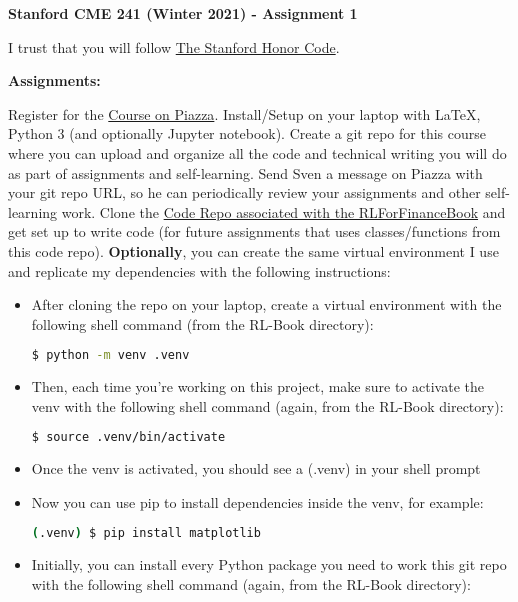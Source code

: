 \documentclass[12pt]{exam}
\begin{document}
\begin{center}
{\large {\bf Stanford CME 241 (Winter 2021) - Assignment 1}}
\end{center}

I trust that you will follow \href{https://communitystandards.stanford.edu/policies-and-guidance/honor-code}{The Stanford Honor Code}.
 
{\large{\bf Assignments:}}
\begin{questions}
\question Register for the \href{https://piazza.com/stanford/winter2021/cme241/home}{Course on Piazza}.
\question Install/Setup on your laptop with LaTeX, Python 3 (and optionally Jupyter notebook).
\question Create a git repo for this course where you can upload and organize all the code and technical writing you will do as part of assignments and self-learning.
\question Send Sven a message on Piazza with your git repo URL, so he can periodically review your assignments and other self-learning work.
\question Clone the \href{https://github.com/TikhonJelvis/RL-book}{Code Repo associated with the RLForFinanceBook} and get set up to write code (for future assignments that uses classes/functions from this code repo). {\bf Optionally}, you can create the same virtual environment I use and replicate my dependencies with the following instructions:
\begin{itemize}
\item After cloning the repo on your laptop, create a virtual environment with the following shell command (from the RL-Book directory):
\begin{lstlisting}[language=bash]
$ python -m venv .venv
\end{lstlisting}
\item Then, each time you're working on this project, make sure to activate the venv with the following shell command (again, from the RL-Book directory):
\begin{lstlisting}[language=bash]
$ source .venv/bin/activate
\end{lstlisting}
\item Once the venv is activated, you should see a (.venv) in your shell prompt
\item Now you can use pip to install dependencies inside the venv, for example:
\begin{lstlisting}[language=bash]
(.venv) $ pip install matplotlib
\end{lstlisting}
\item Initially, you can install every Python package you need to work this git repo with the following shell command (again, from the RL-Book directory):

\end{itemize}
\end{questions}
\end{document}
